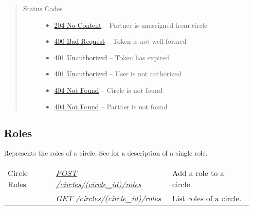 \documentclass[letterpaper,10pt,english]{sphinxmanual}
\begin{document}
\begin{fulllineitems}
\begin{quote}
\begin{description}
\item[{Status Codes}] \leavevmode\begin{itemize}
\item {} 
\href{http://www.w3.org/Protocols/rfc2616/rfc2616-sec10.html\#sec10.2.5}{204 No Content} -- Partner is unassigned from circle

\item {} 
\href{http://www.w3.org/Protocols/rfc2616/rfc2616-sec10.html\#sec10.4.1}{400 Bad Request} -- Token is not well-formed

\item {} 
\href{http://www.w3.org/Protocols/rfc2616/rfc2616-sec10.html\#sec10.4.2}{401 Unauthorized} -- Token has expired

\item {} 
\href{http://www.w3.org/Protocols/rfc2616/rfc2616-sec10.html\#sec10.4.2}{401 Unauthorized} -- User is not authorized

\item {} 
\href{http://www.w3.org/Protocols/rfc2616/rfc2616-sec10.html\#sec10.4.5}{404 Not Found} -- Circle is not found

\item {} 
\href{http://www.w3.org/Protocols/rfc2616/rfc2616-sec10.html\#sec10.4.5}{404 Not Found} -- Partner is not found

\end{itemize}

\end{description}\end{quote}

\end{fulllineitems}



\subsection{Roles}
\label{\detokenize{resources/circle:roles}}
Represents the roles of a circle. See {\hyperref[\detokenize{resources/role:role}]{}} for a description of a single role.

\noindent\begin{tabulary}{\linewidth}{|L|L|L|}
\hline
{}\relax &\relax &\relax \\
\hline
Circle Roles
&
{\hyperref[\detokenize{resources/circle:post--circles-(circle_id)-roles}]{\emph{POST /circles/(circle\_id)/roles}}}
&
Add a role to a circle.
\\
\hline&
{\hyperref[\detokenize{resources/circle:get--circles-(circle_id)-roles}]{\emph{GET /circles/(circle\_id)/roles}}}
&
List roles of a circle.
\\
\hline\end{tabulary}
\end{document}
